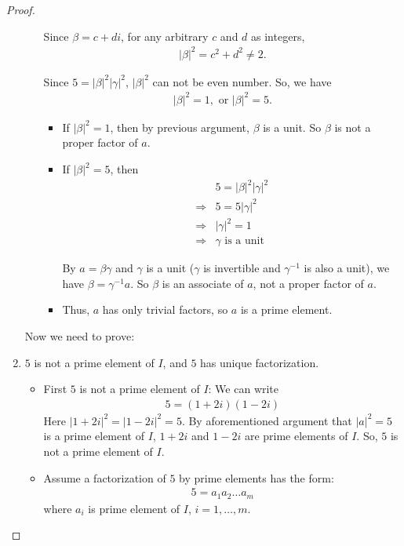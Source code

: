\documentclass[utf8]{ctexbook}
\theoremstyle{definition}
\begin{document}
\begin{proof}
\begin{enumerate}
\begin{itemize}
{Since $\beta = c + d i$, for any arbitrary $c$ and $d$ as integers,
\begin{align*}
|\beta |^2 = c^2 + d^2 \neq 2 .
\end{align*}


Since $5 =  |\beta |^2 | \gamma |^2$, $|\beta |^2$ can not be even number. So, we have 
\begin{align*}
|\beta |^2 = 1, \mbox{ or } |\beta |^2 = 5 .
\end{align*}


\begin{itemize}
\item{If $|\beta |^2 = 1$, then by previous argument, $\beta$ is a unit. So $\beta$ is not a proper factor of $a$.}
\item{If $|\beta |^2 = 5 $, then 
\begin{align*}
& 5 =  |\beta |^2 | \gamma |^2  \\
\Longrightarrow & 5 = 5 | \gamma |^2  \\
\Longrightarrow & | \gamma |^2 = 1 \\
\Longrightarrow & \gamma \mbox{ is a unit}
\end{align*}

By $a = \beta \gamma $ and $\gamma$ is a unit ($\gamma$ is invertible and $\gamma^{-1}$ is also a unit), we have $\beta = \gamma^{-1} a$. So $\beta$ is an associate of $a$, not a proper factor of $a$.
}
\item{ Thus, $a$ has only trivial factors, so $a$ is a prime element.}
\end{itemize}

}
\end{itemize}


Now we need to prove:
\item{$5$ is not a prime element of $I$, and $5$ has unique factorization.}
\begin{itemize}
\item{First $5$ is not a prime element of $I$:
We can write
\begin{align*}
5 = (1 + 2 i ) (1 - 2 i )
\end{align*}
Here $|1 + 2i|^2 = | 1-2i|^2 = 5$. By aforementioned argument that $|a|^2 = 5$ is a prime element of $I$, $1 + 2i$ and $1 - 2i$ are prime elements of $I$. So, $5 $ is not a prime element of $I$.}
\item{Assume a factorization of $5$ by prime elements has the form:
\begin{align*}
5 = a_1 a_2 \ldots a_m
\end{align*}
where $a_i$ is prime element of $I$, $i = 1, \ldots, m$.

}
\end{itemize}
\end{enumerate}
\end{proof}
\end{document}
